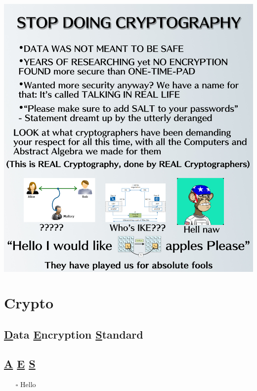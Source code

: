 \documentclass[
  10pt,
  a4paper,
  twocolumn]{article}
\providecommand{\tightlist}{%
  \setlength{\itemsep}{0pt}\setlength{\parskip}{0pt}}\usepackage{longtable,booktabs,array}
\renewcommand*\contentsname{Inhaltsverzeichnis}
\newcommand\contentsname{Inhaltsverzeichnis}
\begin{document}
\renewcommand*\contentsname{Inhaltsverzeichnis}
{
\hypersetup{linkcolor=}
\setcounter{tocdepth}{3}
\tableofcontents
}
\newpage

\includegraphics{images/cryptography meme.jpg}

\section{Crypto}\label{crypto}

\subsection{\texorpdfstring{\ul{D}ata \ul{E}ncryption
\ul{S}tandard}{Data Encryption Standard}}\label{data-encryption-standard}

\subsection{\texorpdfstring{\ul{A} \ul{E} \ul{S}}{A E S}}\label{a-e-s}

\begin{itemize}
\tightlist
\item[$\square$]
  Hello
\end{itemize}
\end{document}
